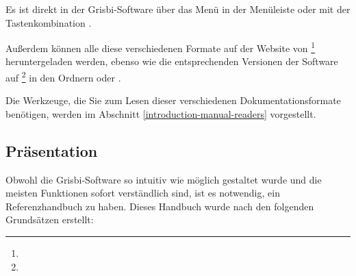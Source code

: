 Es ist direkt in der Grisbi-Software über das Menü  in der Menüleiste oder mit der Tastenkombination .

Außerdem können alle diese verschiedenen Formate auf der Website von \footnote{\urlSourceForgeDocumentation{}} heruntergeladen werden, ebenso wie die entsprechenden Versionen der Software auf \footnote{\urlSourceForge{}} in den Ordnern  oder .

Die Werkzeuge, die Sie zum Lesen dieser verschiedenen Dokumentationsformate benötigen, werden im Abschnitt \vref{introduction-manual-readers}  vorgestellt.

\subsection{Präsentation\label{introduction-manual-presentation}}

Obwohl die Grisbi-Software so intuitiv wie möglich gestaltet wurde und die meisten Funktionen sofort verständlich sind, ist es notwendig, ein Referenzhandbuch zu haben. Dieses Handbuch wurde nach den folgenden Grundsätzen erstellt:

